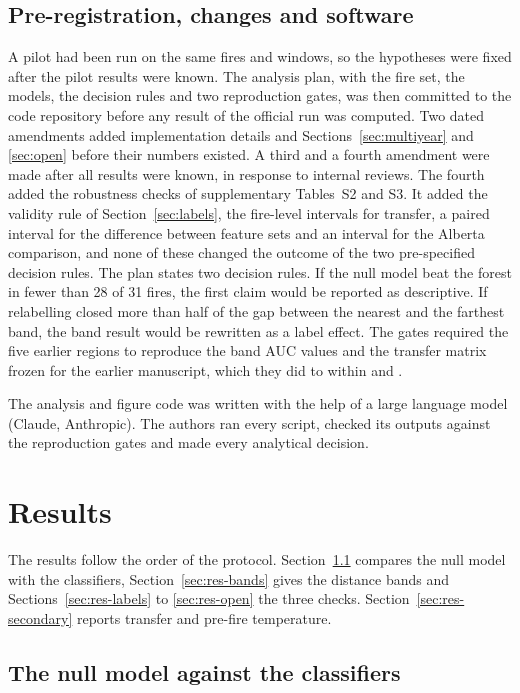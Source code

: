 \documentclass[preprint,12pt,authoryear]{elsarticle}
\begin{document}
\subsection{Pre-registration, changes and software}
\label{sec:prereg}

A pilot had been run on the same fires and windows, so the hypotheses were fixed after the pilot results were known. The analysis plan, with the fire set, the models, the decision rules and two reproduction gates, was then committed to the code repository before any result of the official run was computed. Two dated amendments added implementation details and Sections~\ref{sec:multiyear} and \ref{sec:open} before their numbers existed. A third and a fourth amendment were made after all results were known, in response to internal reviews. The fourth added the robustness checks of supplementary Tables~S2 and S3. It added the validity rule of Section~\ref{sec:labels}, the fire-level intervals for transfer, a paired interval for the difference between feature sets and an interval for the Alberta comparison, and none of these changed the outcome of the two pre-specified decision rules. The plan states two decision rules. If the null model beat the forest in fewer than 28 of 31 fires, the first claim would be reported as descriptive. If relabelling closed more than half of the gap between the nearest and the farthest band, the band result would be rewritten as a label effect. The gates required the five earlier regions to reproduce the band AUC values and the transfer matrix frozen for the earlier manuscript, which they did to within \vgateBand{} and \vgateTransfer{}.

The analysis and figure code was written with the help of a large language model (Claude, Anthropic). The authors ran every script, checked its outputs against the reproduction gates and made every analytical decision.

\section{Results}
\label{sec:results}

The results follow the order of the protocol. Section~\ref{sec:res-null} compares the null model with the classifiers, Section~\ref{sec:res-bands} gives the distance bands and Sections~\ref{sec:res-labels} to \ref{sec:res-open} the three checks. Section~\ref{sec:res-secondary} reports transfer and pre-fire temperature.

\subsection{The null model against the classifiers}
\label{sec:res-null}
\end{document}
